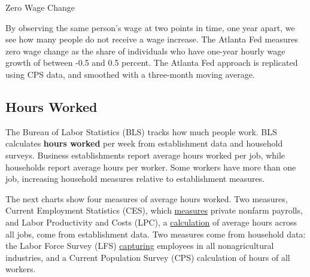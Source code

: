 \begin{minipage}{0.76\textwidth}
\vspace{3mm}

\normalsize Zero Wage Change
\vspace*{-0.5mm}

\small By observing the same person's wage at two points in time, one year apart, we see how many people do not receive a wage increase. The Atlanta Fed measures zero wage change as the share of individuals who have one-year hourly wage growth of between -0.5 and 0.5 percent. The Atlanta Fed approach is replicated using CPS data, and smoothed with a three-month moving average. 


\vspace{1mm}

\vspace{2.5cm}

\hspace{5mm} 

\end{minipage}
\newpage


\hypertarget{labh}{\label{labh}}
\subsection*{Hours Worked}   
\begin{minipage}{0.76\textwidth}
\small The Bureau of Labor Statistics (BLS) tracks how much people work. BLS calculates \textbf{hours worked} per week from establishment data and household surveys. Business establishments report average hours worked per job, while households report average hours per worker. Some workers have more than one job, increasing household measures relative to establishment measures. 

The next charts show four measures of average hours worked. Two measures, Current Employment Statistics (CES), which \href{https://www.bls.gov/news.release/empsit.t18.htm}{measures} private nonfarm payrolls, and Labor Productivity and Costs (LPC), a \href{https://www.bls.gov/productivity/tables/}{calculation} of average hours across all jobs, come from establishment data. Two measures come from household data: the Labor Force Survey (LFS) \href{https://www.bls.gov/web/empsit/cpseea26.htm}{capturing} employees in all nonagricultural industries, and a Current Population Survey (CPS) calculation of hours of all workers. 
\end{minipage}
\vspace{1mm}

